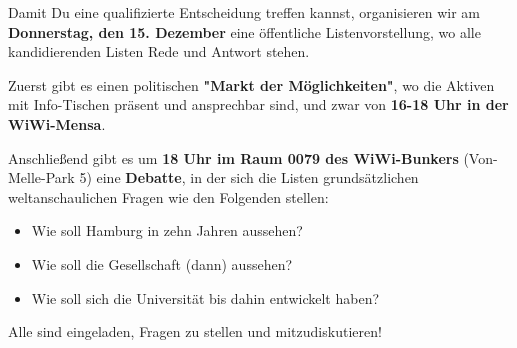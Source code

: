 \documentclass[a4paper,ngerman,headheight=80pt,12pt,DIV=calc]{scrartcl}
\begin{document}
    Damit Du eine qualifizierte Entscheidung treffen kannst, organisieren wir
    am \textbf{Donnerstag, den 15. Dezember} eine öffentliche Listenvorstellung,
    wo alle kandidierenden Listen Rede und Antwort stehen.

    Zuerst gibt es einen politischen \textbf{"Markt der Möglichkeiten"}, wo die Aktiven
    mit Info-Tischen präsent und ansprechbar sind, und zwar von \textbf{16-18 Uhr
    in der WiWi-Mensa}.

    Anschließend gibt es um \textbf{18 Uhr im Raum 0079 des WiWi-Bunkers}
    (Von-Melle-Park 5) eine \textbf{Debatte}, in der sich die Listen grundsätzlichen
    weltanschaulichen Fragen wie den Folgenden stellen:

    \begin{itemize}
        \item Wie soll Hamburg in zehn Jahren aussehen?
        \item Wie soll die Gesellschaft (dann) aussehen?
        \item Wie soll sich die Universität bis dahin entwickelt haben?
    \end{itemize}

    Alle sind eingeladen, Fragen zu stellen und mitzudiskutieren!
\end{document}

